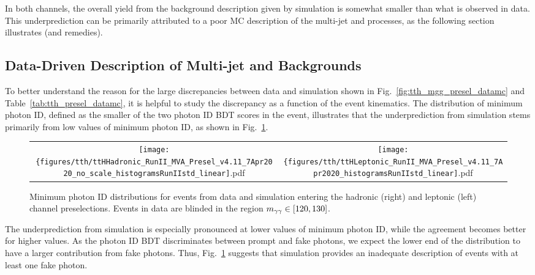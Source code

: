 In both channels, the overall yield from the background description given by simulation is somewhat smaller than what is observed in data.
This underprediction can be primarily attributed to a poor MC description of the multi-jet and \gjets processes, as the following section illustrates (and remedies). 

\subsection{Data-Driven Description of Multi-jet and \gjets Backgrounds} \label{sec:tth_datadriven}
To better understand the reason for the large discrepancies between data and simulation shown in Fig.~\ref{fig:tth_mgg_presel_datamc} and Table~\ref{tab:tth_presel_datamc}, it is helpful to study the discrepancy as a function of the event kinematics.
The distribution of minimum photon ID, defined as the smaller of the two photon ID BDT scores in the event, illustrates that the underprediction from simulation stems primarily from low values of minimum photon ID, as shown in Fig.~\ref{fig:tth_phoID_presel_datamc}.
\begin{figure} [h!]
    \centering
    \begin{tabular}{c c}
        \texttt{[image: \{figures/tth/ttHHadronic\_RunII\_MVA\_Presel\_v4.11\_7Apr2020\_no\_scale\_histogramsRunIIstd\_linear]}.pdf} &
        \texttt{[image: \{figures/tth/ttHLeptonic\_RunII\_MVA\_Presel\_v4.11\_7Apr2020\_histogramsRunIIstd\_linear]}.pdf}
    \end{tabular}
    \caption{Minimum photon ID distributions for events from data and simulation entering the hadronic (right) and leptonic (left) channel preselections. Events in data are blinded in the region $m_{\gamma\gamma} \in [120, 130]$.}
    \label{fig:tth_phoID_presel_datamc}
\end{figure}

The underprediction from simulation is especially pronounced at lower values of minimum photon ID, while the agreement becomes better for higher values. 
As the photon ID BDT discriminates between prompt and fake photons, we expect the lower end of the distribution to have a larger contribution from fake photons.
Thus, Fig.~\ref{fig:tth_phoID_presel_datamc} suggests that simulation provides an inadequate description of events with at least one fake photon. 

